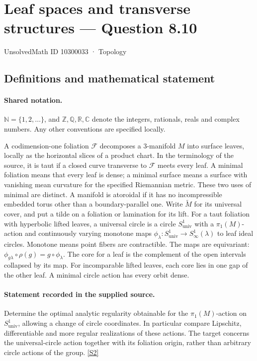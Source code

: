 \documentclass[11pt]{article}
\newcommand{\sref}[2]{\hyperlink{source:#1:#2}{[S#2]}}
\begin{document}
\setcounter{section}{10300032}
\section{Leaf spaces and transverse structures — Question 8.10}\label{10300033}
{\small\sffamily UnsolvedMath ID 10300033 · Topology}
\subsection{Definitions and mathematical statement}

\paragraph{Shared notation.}$\mathbb N=\{1,2,\ldots\}$, and $\mathbb Z,\mathbb Q,\mathbb R,\mathbb C$ denote the integers, rationals, reals and complex numbers. Any other conventions are specified locally.


A codimension-one foliation $\mathcal F$ decomposes a $3$-manifold $M$ into surface leaves, locally as the horizontal slices of a product chart. In the terminology of the source, it is taut if a closed curve transverse to $\mathcal F$ meets every leaf. A minimal foliation means that every leaf is dense; a minimal surface means a surface with vanishing mean curvature for the specified Riemannian metric. These two uses of minimal are distinct. A manifold is atoroidal if it has no incompressible embedded torus other than a boundary-parallel one. Write $\widetilde M$ for its universal cover, and put a tilde on a foliation or lamination for its lift. For a taut foliation with hyperbolic lifted leaves, a universal circle is a circle $S^1_{\mathrm{univ}}$ with a $\pi_1(M)$-action and continuously varying monotone maps $\phi_\lambda:S^1_{\mathrm{univ}}\to S^1_\infty(\lambda)$ to leaf ideal circles. Monotone means point fibers are contractible. The maps are equivariant: $\phi_{g\lambda}\circ\rho(g)=g\circ\phi_\lambda$. The core for a leaf is the complement of the open intervals collapsed by its map. For incomparable lifted leaves, each core lies in one gap of the other leaf. A minimal circle action has every orbit dense.
\paragraph{Statement recorded in the supplied source.}
Determine the optimal analytic regularity obtainable for the $\pi_1(M)$-action on $S^1_{\mathrm{univ}}$, allowing a change of circle coordinates. In particular compare Lipschitz, differentiable and more regular realizations of these actions. The target concerns the universal-circle action together with its foliation origin, rather than arbitrary circle actions of the group. \sref{10300033}{2}
\end{document}
